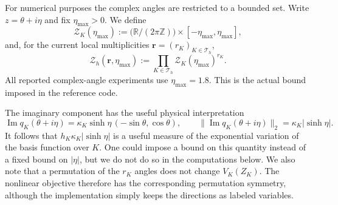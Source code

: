 \documentclass[pdflatex,sn-mathphys-num]{sn-jnl}
\theoremstyle{thmstyleone}
\theoremstyle{thmstyletwo}
\newcommand{\R}{\mathbb R}
\newcommand{\Th}{\mathcal T_h}
\begin{document}
For numerical purposes the complex angles are restricted to a bounded set.  Write
$z=\theta+i\eta$ and fix $\eta_{\max}>0$.  We define
\begin{equation}\label{eq:ZK-adm}
 \mathcal Z_K(\eta_{\max})
 :=\big(\R/(2\pi\mathbb Z)\big)\times[-\eta_{\max},\eta_{\max}],
\end{equation}
and, for the current local multiplicities $\bm r=(r_K)_{K\in\Th}$,
\begin{equation}\label{eq:Zh-adm}
 \mathcal Z_h(\bm r,\eta_{\max})
 :=\prod_{K\in\Th}\mathcal Z_K(\eta_{\max})^{r_K}.
\end{equation}
All reported complex-angle experiments use $\eta_{\max}=1.8$.  This is the actual bound imposed in the reference code.

The imaginary component has the useful physical interpretation
\begin{equation}\label{eq:imq}
 \operatorname{Im}q_K(\theta+i\eta)
 =\kappa_K\sinh\eta\,(-\sin\theta,\cos\theta),
 \qquad
 \|\operatorname{Im}q_K(\theta+i\eta)\|_2
 =\kappa_K|\sinh\eta|.
\end{equation}
It follows that $h_K\kappa_K|\sinh\eta|$ is a useful measure of the exponential variation of the basis function over $K$.  One could impose a bound on this quantity instead of a fixed bound on $|\eta|$, but we do not do so in the computations below.  We also note that a permutation of the $r_K$ angles does not change $V_K(Z_K)$.  The nonlinear objective therefore has the corresponding permutation symmetry, although the implementation simply keeps the directions as labeled variables.
\end{document}
